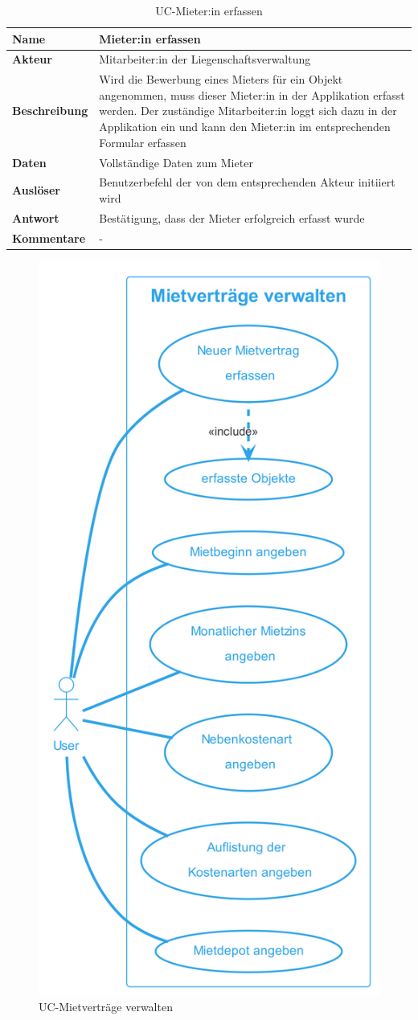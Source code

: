 \begin{table}[H]
  \centering
  \settowidth{}
  \setlength\extrarowheight{2pt}
  \begin{tabulary}{1.0\textwidth}{|a|m{14cm}|}
    \hline
    \textbf{Name}& Mieter:in erfassen\\
    \hline
    \textbf{Akteur}& Mitarbeiter:in der Liegenschaftsverwaltung\\
    \hline 
    \textbf{Beschreibung} & Wird die Bewerbung eines Mieters für ein Objekt angenommen, muss dieser Mieter:in in der Applikation erfasst werden. Der zuständige Mitarbeiter:in loggt sich dazu in der Applikation ein und kann den Mieter:in im entsprechenden Formular erfassen\\
    \hline
    \textbf{Daten} & Vollständige Daten zum Mieter\\
    \hline
    \textbf{Auslöser} & Benutzerbefehl der von dem entsprechenden Akteur initiiert wird\\
    \hline
    \textbf{Antwort} & Bestätigung, dass der Mieter erfolgreich erfasst wurde\\
    \hline
    \textbf{Kommentare} & -\\
    \hline
  \end{tabulary}
  \caption{UC-Mieter:in erfassen}
\end{table}

\begin{figure}[H]
  \begin{center}
    \includegraphics[width=0.43\linewidth]{content/diagrams/out/usecase/mietverträgeVerwalten/MietverträgeVerwalten.png}
    \caption{UC-Mietverträge verwalten}
  \end{center}
\end{figure}

